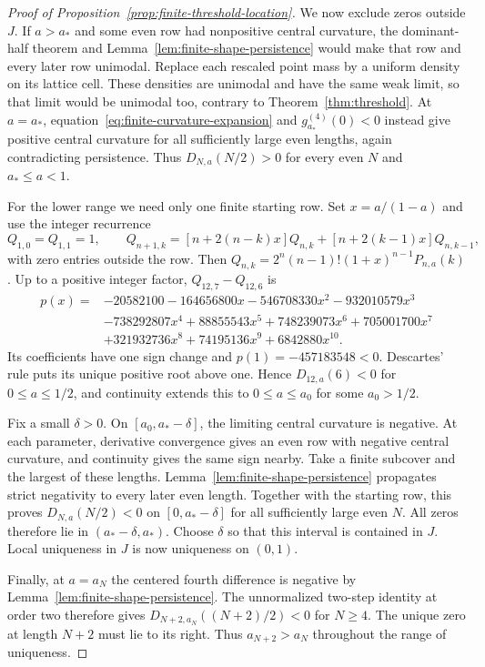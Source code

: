 \begin{proof}[Proof of Proposition~\ref{prop:finite-threshold-location}]
We now exclude zeros outside $J$. If $a>a_*$ and some even row
had nonpositive central curvature, the dominant-half theorem and
Lemma~\ref{lem:finite-shape-persistence} would make that row and every
later row unimodal. Replace each rescaled point mass by a uniform
density on its lattice cell. These densities are unimodal and have
the same weak limit, so that limit would be unimodal too,
contrary to Theorem~\ref{thm:threshold}.
At $a=a_*$, equation~\eqref{eq:finite-curvature-expansion} and
$g_{a_*}^{(4)}(0)<0$ instead give positive central curvature for
all sufficiently large even lengths, again contradicting persistence.
Thus $D_{N,a}(N/2)>0$ for every even $N$ and $a_*\le a<1$.

For the lower range we need only one finite starting row.
Set $x=a/(1-a)$ and use the integer recurrence
\[
 Q_{1,0}=Q_{1,1}=1,\qquad
 Q_{n+1,k}=[n+2(n-k)x]Q_{n,k}+[n+2(k-1)x]Q_{n,k-1},
\]
with zero entries outside the row. Then
$Q_{n,k}=2^n(n-1)!(1+x)^{n-1}P_{n,a}(k)$.
Up to a positive integer factor, $Q_{12,7}-Q_{12,6}$ is
\begin{align*}
 p(x)={}&-20582100-164656800x-546708330x^2-932010579x^3\\
 &-738292807x^4+88855543x^5+748239073x^6+705001700x^7\\
 &+321932736x^8+74195136x^9+6842880x^{10}.
\end{align*}
Its coefficients have one sign change and $p(1)=-457183548<0$.
Descartes' rule puts its unique positive root above one.
Hence $D_{12,a}(6)<0$ for $0\le a\le1/2$, and continuity extends
this to $0\le a\le a_0$ for some $a_0>1/2$.

Fix a small $\delta>0$. On $[a_0,a_*-\delta]$, the limiting
central curvature is negative. At each parameter, derivative
convergence gives an even row with negative central curvature,
and continuity gives the same sign nearby. Take a finite subcover
and the largest of these lengths. Lemma~\ref{lem:finite-shape-persistence}
propagates strict negativity to every later even length.
Together with the starting row, this proves
$D_{N,a}(N/2)<0$ on $[0,a_*-\delta]$ for all sufficiently large even $N$.
All zeros therefore lie in $(a_*-\delta,a_*)$. Choose $\delta$
so that this interval is contained in $J$. Local uniqueness in $J$
is now uniqueness on $(0,1)$.

Finally, at $a=a_N$ the centered fourth difference is negative by
Lemma~\ref{lem:finite-shape-persistence}. The unnormalized two-step
identity at order two therefore gives
$D_{N+2,a_N}((N+2)/2)<0$ for $N\ge4$.
The unique zero at length $N+2$ must lie to its right.
Thus $a_{N+2}>a_N$ throughout the range of uniqueness.
\end{proof}
